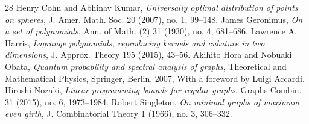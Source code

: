 \begin{thebibliography}{28}
 Henry Cohn and Abhinav Kumar, \emph{Universally optimal distribution of points on spheres}, J. Amer. Math. Soc. 20 (2007), no. 1, 99--148.
 James Geronimus, \emph{On a set of polynomials}, Ann. of Math. (2) 31 (1930), no. 4, 681--686.
 Lawrence A. Harris, \emph{Lagrange polynomials, reproducing kernels and cubature in two dimensions}, J. Approx. Theory 195 (2015), 43--56.
 Akihito Hora and Nobuaki Obata, \emph{Quantum probability and spectral analysis of graphs}, Theoretical and Mathematical Physics, Springer, Berlin, 2007, With a foreword by Luigi Accardi.
 Hiroshi Nozaki, \emph{Linear programming bounds for regular graphs}, Graphs Combin. 31 (2015), no. 6, 1973--1984.
 Robert Singleton, \emph{On minimal graphs of maximum even girth}, J. Combinatorial Theory 1 (1966), no. 3, 306--332.
\end{thebibliography}
